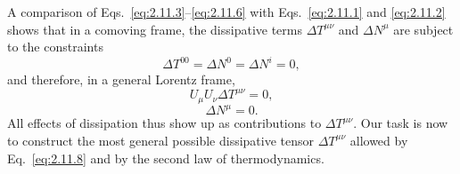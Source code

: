 A comparison of Eqs.~\eqref{eq:2.11.3}--\eqref{eq:2.11.6} with
Eqs.~\eqref{eq:2.11.1} and \eqref{eq:2.11.2} shows that in a comoving frame,
the dissipative terms \(\Delta T^{\mu\nu}\) and \(\Delta N^\mu\) are subject
to the constraints
\begin{equation}
  \Delta T^{00}=\Delta N^0=\Delta N^i=0 ,
  \tag{2.11.7}\label{eq:2.11.7}
\end{equation}
and therefore, in a general Lorentz frame,
\begin{equation}
  U_\mu U_\nu\Delta T^{\mu\nu}=0 ,
  \tag{2.11.8}\label{eq:2.11.8}
\end{equation}
\begin{equation}
  \Delta N^\mu=0 .
  \tag{2.11.9}\label{eq:2.11.9}
\end{equation}
All effects of dissipation thus show up as contributions to
\(\Delta T^{\mu\nu}\). Our task is now to construct the most general possible
dissipative tensor \(\Delta T^{\mu\nu}\) allowed by Eq.~\eqref{eq:2.11.8}
and by the second law of thermodynamics.

